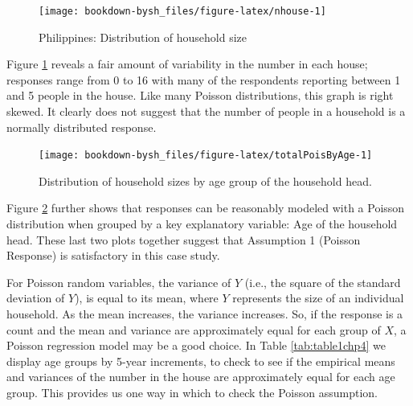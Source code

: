\documentclass[
]{krantz}
\begin{document}
\begin{figure}

{\centering \texttt{[image: bookdown-bysh\_files/figure-latex/nhouse-1]} 

}

\caption{Philippines: Distribution of household size}\label{fig:nhouse}
\end{figure}

Figure \ref{fig:nhouse} reveals a fair amount of variability in the number in each house; responses range from 0 to 16 with many of the respondents reporting between 1 and 5 people in the house. Like many Poisson distributions, this graph is right skewed. It clearly does not suggest that the number of people in a household is a normally distributed response.

\begin{figure}

{\centering \texttt{[image: bookdown-bysh\_files/figure-latex/totalPoisByAge-1]} 

}

\caption{Distribution of household sizes by age group of the household head.}\label{fig:totalPoisByAge}
\end{figure}

Figure \ref{fig:totalPoisByAge} further shows that responses can be reasonably modeled with a Poisson distribution when grouped by a key explanatory variable: Age of the household head. These last two plots together suggest that Assumption 1 (Poisson Response) is satisfactory in this case study.

For Poisson random variables, the variance of \(Y\) (i.e., the square of the standard deviation of \(Y\)), is equal to its mean, where \(Y\) represents the size of an individual household. As the mean increases, the variance increases. So, if the response is a count and the mean and variance are approximately equal for each group of \(X\), a Poisson regression model may be a good choice. In Table \ref{tab:table1chp4} we display age groups by 5-year increments, to check to see if the empirical means and variances of the number in the house are approximately equal for each age group. This provides us one way in which to check the Poisson assumption.
\end{document}
